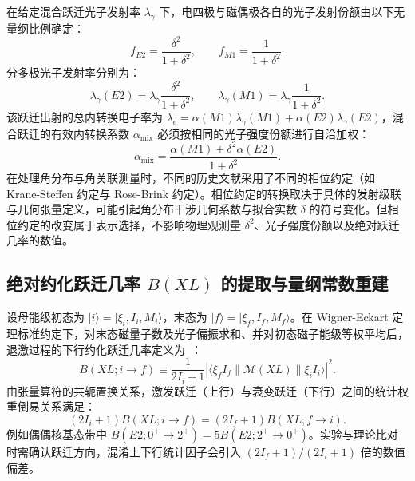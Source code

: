 在给定混合跃迁光子发射率 $\lambda_\gamma$ 下，电四极与磁偶极各自的光子发射份额由以下无量纲比例确定：
\begin{equation}\label{eq:5-9-multipole-frac}
f_{E2} = \frac{\delta^2}{1 + \delta^2}, \qquad f_{M1} = \frac{1}{1 + \delta^2}.
\end{equation}
分多极光子发射率分别为：
\begin{equation}\label{eq:5-9-lambda-multipole}
\lambda_\gamma(E2) = \lambda_\gamma \frac{\delta^2}{1 + \delta^2}, \qquad \lambda_\gamma(M1) = \lambda_\gamma \frac{1}{1 + \delta^2}.
\end{equation}
该跃迁出射的总内转换电子率为 $\lambda_e = \alpha(M1) \lambda_\gamma(M1) + \alpha(E2) \lambda_\gamma(E2)$，混合跃迁的有效内转换系数 $\alpha_{\text{mix}}$ 必须按相同的光子强度份额进行自洽加权：
\begin{equation}\label{eq:5-9-alpha-mix}
\alpha_{\text{mix}} = \frac{\alpha(M1) + \delta^2 \alpha(E2)}{1 + \delta^2}.
\end{equation}
在处理角分布与角关联测量时，不同的历史文献采用了不同的相位约定（如 Krane-Steffen 约定与 Rose-Brink 约定）。相位约定的转换取决于具体的发射级联与几何张量定义，可能引起角分布干涉几何系数与拟合实数 $\delta$ 的符号变化。但相位约定的改变属于表示选择，不影响物理观测量 $\delta^2$、光子强度份额以及绝对跃迁几率的数值。

\subsection{绝对约化跃迁几率 $B(XL)$ 的提取与量纲常数重建}\label{subsec:5-9-4}

设母能级初态为 $|i\rangle = |\xi_i, I_i, M_i\rangle$，末态为 $|f\rangle = |\xi_f, I_f, M_f\rangle$。在 Wigner-Eckart 定理标准约定下，对末态磁量子数及光子偏振求和、并对初态磁子能级等权平均后，退激过程的下行约化跃迁几率定义为~\cite{book-suhonen-from-nucleons-to-nucleus}：
\begin{equation}\label{eq:5-9-b-down}
B(XL; i \to f) \equiv \frac{1}{2I_i + 1} |\langle \xi_f I_f \| \mathcal{M}(XL) \| \xi_i I_i \rangle|^2.
\end{equation}
由张量算符的共轭置换关系，激发跃迁（上行）与衰变跃迁（下行）之间的统计权重倒易关系满足：
\begin{equation}\label{eq:5-9-wigner-eckart}
(2I_i + 1) B(XL; i \to f) = (2I_f + 1) B(XL; f \to i).
\end{equation}
例如偶偶核基态带中 $B(E2; 0^+ \to 2^+) = 5 B(E2; 2^+ \to 0^+)$。实验与理论比对时需确认跃迁方向，混淆上下行统计因子会引入 $(2I_f+1)/(2I_i+1)$ 倍的数值偏差。


